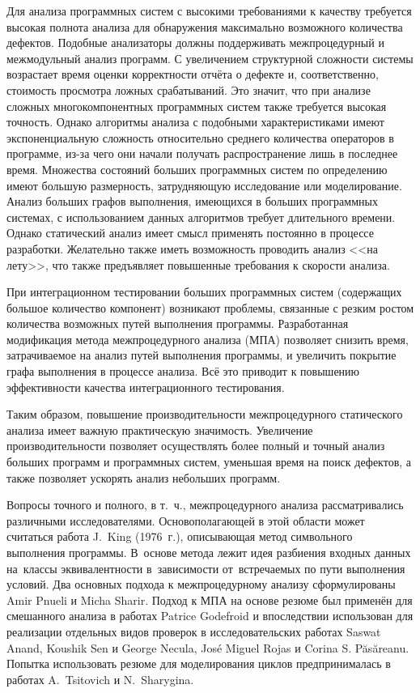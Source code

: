 Для анализа программных систем с высокими требованиями к качеству требуется высокая полнота анализа для обнаружения максимально возможного количества дефектов. Подобные анализаторы должны поддерживать межпроцедурный и межмодульный анализ программ. С увеличением структурной сложности системы возрастает время оценки корректности отчёта о дефекте и, соответственно, стоимость просмотра ложных срабатываний. Это значит, что при анализе сложных многокомпонентных программных систем также требуется высокая точность. Однако алгоритмы анализа с подобными характеристиками имеют экспоненциальную сложность относительно среднего количества операторов в программе, из-за чего они начали получать распространение лишь в последнее время. Множества состояний больших программных систем по определению имеют большую размерность, затрудняющую исследование или моделирование. Анализ больших графов выполнения, имеющихся в больших программных системах, с использованием данных алгоритмов требует длительного времени. Однако статический анализ имеет смысл применять постоянно в процессе разработки. Желательно также иметь возможность проводить анализ <<на лету>>, что также предъявляет повышенные требования к скорости анализа.

При интеграционном тестировании больших программных систем (содержащих большое количество компонент) возникают проблемы, связанные с резким ростом количества возможных путей выполнения программы. Разработанная модификация метода межпроцедурного анализа (МПА) позволяет снизить время, затрачиваемое на анализ путей выполнения программы, и увеличить покрытие графа выполнения в процессе анализа. Всё это приводит к повышению эффективности качества интеграционного тестирования.

Таким образом, повышение производительности межпроцедурного статического анализа имеет важную практическую значимость. Увеличение производительности позволяет осуществлять более полный и точный анализ больших программ и программных систем, уменьшая время на поиск дефектов, а также позволяет ускорять анализ небольших программ.

Вопросы точного и полного, в т.~ч., межпроцедурного анализа рассматривались различными исследователями. Основополагающей в этой области может считаться работа J.~King (1976~г.), описывающая метод символьного выполнения программы. В~основе метода лежит идея разбиения входных данных на~классы эквивалентности в~зависимости от~встречаемых по пути выполнения условий. Два основных подхода к межпроцедурному анализу сформулированы Amir Pnueli и Micha Sharir. Подход к МПА на основе резюме был применён для смешанного анализа в работах Patrice Godefroid и впоследствии использован для реализации отдельных видов проверок в исследовательских работах Saswat Anand, Koushik Sen и George Necula, Jos\'{e} Miguel Rojas и Corina S. P\u{a}s\u{a}reanu. Попытка использовать резюме для моделирования циклов предпринималась в работах A.~Tsitovich и N.~Sharygina.

